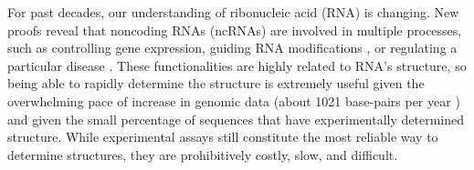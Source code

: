 For past decades, our understanding of ribonucleic acid (RNA) is changing. 
New proofs reveal that noncoding RNAs (ncRNAs) are involved in multiple processes, such as controlling gene expression, guiding RNA modifications \cite{Eddy:2001}, or regulating a particular disease \cite{Kung+:2013}. 
These functionalities are highly related to RNA's structure, 
so being able to rapidly determine the structure is extremely useful 
given the overwhelming pace of increase in genomic data (about 1021 base-pairs per year \cite{stephens+:2015}) %
and given the small percentage of sequences that have experimentally determined structure. 
While experimental assays still constitute the most reliable way to determine structures, they are prohibitively costly, slow, and difficult.


